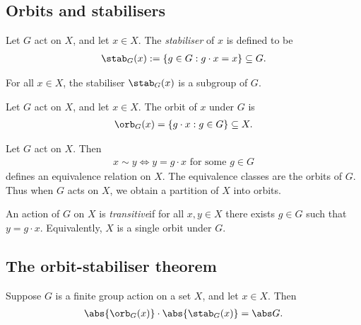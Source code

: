 \documentclass{article}
\begin{document}
\subsection{Orbits and stabilisers}

\begin{definition}
	Let $G$ act on $X$, and let $x\in X$. The \emph{stabiliser} of $x$ is defined
	to be
	\begin{align*}
		\stab_G(x) :=\{g\in G:g\cdot x = x\}\subseteq G.
	\end{align*}
\end{definition}

\begin{lemma}
	For all $x\in X$, the stabiliser $\stab_G(x)$ is a subgroup of $G$.
\end{lemma}

\begin{definition}
	Let $G$ act on $X$, and let $x\in X$. The orbit of $x$ under $G$ is
	\begin{align*}
		\orb_G(x) = \{g\cdot x : g\in G\}\subseteq X.
	\end{align*}
\end{definition}

\begin{theorem}
	Let $G$ act on $X$. Then
	\begin{align*}
		x\sim y \Leftrightarrow y = g\cdot x \text{ for some }g\in G
	\end{align*}
	defines an equivalence relation on $X$. The equivalence classes are
	the orbits of $G$. Thus when $G$ acts on $X$, we obtain a partition
	of $X$ into orbits.
\end{theorem}

\setcounter{theorem}{6}
\begin{definition}
	An action of $G$ on $X$ is \emph{transitive}if for all $x,y\in X$
	there exists $g\in G$ such that $y=g\cdot x$. Equivalently, $X$
	is a single orbit under $G$.
\end{definition}

\subsection{The orbit-stabiliser theorem}

\begin{theorem}
	Suppose $G$ is a finite group action on a set $X$, and let $x\in X$.
	Then
	\begin{align*}
		\abs{\orb_G(x)}\cdot \abs{\stab_G(x)}=\abs G.
	\end{align*}
\end{theorem}
\end{document}
